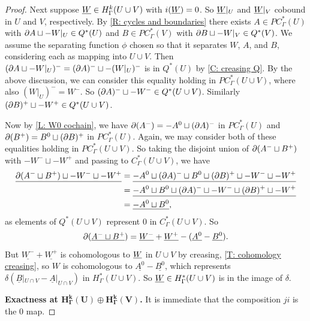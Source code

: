 \begin{proof}
	Next suppose $\underline{W} \in H^k_\Gamma(U \cup V)$ with $i(\underline{W}) = 0$.
	So $\underline{W}|_U$ and $\underline{W}|_V$ cobound in $U$ and $V$, respectively.
	By \cref{R: cycles and boundaries} there exists $A \in PC^*_\Gamma(U)$ with $\partial A \sqcup - W|_U \in Q^*(U)$ and $B \in PC^*_\Gamma(V)$ with $\partial B \sqcup - W|_V \in Q^*(V)$.
	We assume the separating function $\phi$ chosen so that it separates $W$, $A$, and $B$, considering each as mapping into $U \cup V$.
	Then $(\partial A \sqcup - W|_U)^- = (\partial A)^- \sqcup - (W|_U)^-$ is in $Q^*(U)$ by \cref{C: creasing Q}.
	By the above discussion, we can consider this equality holding in $PC^*_\Gamma(U \cup V)$, where also $(W|_U)^- = W^-$.
	So $(\partial A)^- \sqcup - W^- \in Q^*(U \cup V)$.
	Similarly $(\partial B)^+ \sqcup - W^+ \in Q^*(U \cup V)$.

	Now by \cref{L: W0 cochain}, we have $\partial(A^-) = -A^0 \sqcup (\partial A)^-$ in $PC^*_\Gamma(U)$ and $\partial (B^+) = B^0 \sqcup (\partial B)^+$ in $PC^*_\Gamma(U)$.
	Again, we may consider both of these equalities holding in $PC^*_\Gamma(U \cup V)$.
	So taking the disjoint union of $\partial(A^- \sqcup B^+)$ with $- W^- \sqcup - W^+$ and passing to $C^*_\Gamma(U \cup V)$, we have
	\begin{align*}
		\underline{	\partial(A^- \sqcup B^+) \sqcup - W^- \sqcup - W^+} &= \underline{-A^0 \sqcup (\partial A)^- \sqcup B^0 \sqcup (\partial B)^+ \sqcup - W^- \sqcup - W^+ }\\
		&= \underline{-A^0 \sqcup B^0 \sqcup (\partial A)^- \sqcup - W^- \sqcup (\partial B)^+ \sqcup - W^+ }\\
		&= \underline{-A^0 \sqcup B^0},
	\end{align*}
	as elements of $Q^*(U \cup V)$ represent $0$ in $C^*_\Gamma(U \cup V)$.
	So
		\[	\partial (\underline{A^- \sqcup B^+}) = \underline{W^-} + \underline{W^+} -(\underline{A^0}-\underline{B^0}).\]
	But $\underline{W^-} + \underline{W^+}$ is cohomologous to $\underline{W}$ in $U \cup V$ by creasing, \cref{T: cohomology creasing}, so $W$ is cohomologous to $\underline{A^0}-\underline{B^0}$, which represents $\delta(\underline{B}|_{U \cap V}-\underline{A}|_{U \cap V})$ in $H^*_\Gamma(U \cup V)$.
	So $\underline{W} \in H^*_\Gamma(U \cup V)$ is in the image of $\delta$.

	\textbf{Exactness at $\mathbf{H^k_\Gamma(U) \oplus H^k_\Gamma(V)}$.}
	It is immediate that the composition $ji$ is the $0$ map.


\end{proof}
